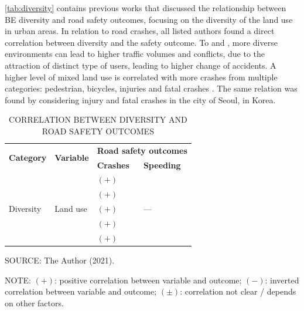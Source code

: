 \autoref{tab:diversity} contains previous works that discussed the relationship between BE diversity and road safety outcomes, focusing on the diversity of the land use in urban areas. In relation to road crashes, all listed authors found a direct correlation between diversity and the safety outcome. To \textcite{Obelheiro2020} and \textcite{Obelheiro2019}, more diverse environments can lead to higher traffic volumes and conflicts, due to the attraction of distinct type of users, leading to higher change of accidents. A higher level of mixed land use is correlated with more crashes from multiple categories: pedestrian, bicycles, injuries and fatal crashes \cite{Ouyang2014}. The same relation was found by \textcite{Rhee2016} considering injury and fatal crashes in the city of Seoul, in Korea.

\begin{table}[!hbtp]
    \footnotesize
    \captionsetup{justification=raggedright,
        singlelinecheck=false,
        font=footnotesize}
    \caption{CORRELATION BETWEEN DIVERSITY AND ROAD SAFETY OUTCOMES}
    \centering
    \begin{tabular}{llll}
        \hline
        \multirow{2}{*}{\textbf{Category}} & \multirow{2}{*}{\textbf{Variable}} & \multicolumn{2}{c}{\textbf{Road safety outcomes}} \\
         &  & \textbf{Crashes} & \textbf{Speeding} \\ \hline
        \multirow{5}{*}{Diversity} & \multirow{5}{*}{Land use} & $(+)$ \textcite{Amoh-Gyimah2017} & \multirow{5}{*}{---} \\
         &  & $(+)$ \textcite{Obelheiro2019} &  \\
         &  & $(+)$ \textcite{Obelheiro2020} &  \\
         &  & $(+)$ \textcite{Ouyang2014} &  \\
         &  & $(+)$ \textcite{Rhee2016} &  \\ \hline
    \end{tabular}
    \label{tab:diversity}
    \par \vspace{2mm} \footnotesize \raggedright
    SOURCE: The Author (2021).
    \par \vspace{1mm} \footnotesize \raggedright
    NOTE: $(+)$: positive correlation between variable and outcome; $(-)$: inverted correlation between variable and outcome; $(\pm)$: correlation not clear / depends on other factors.
\end{table}

